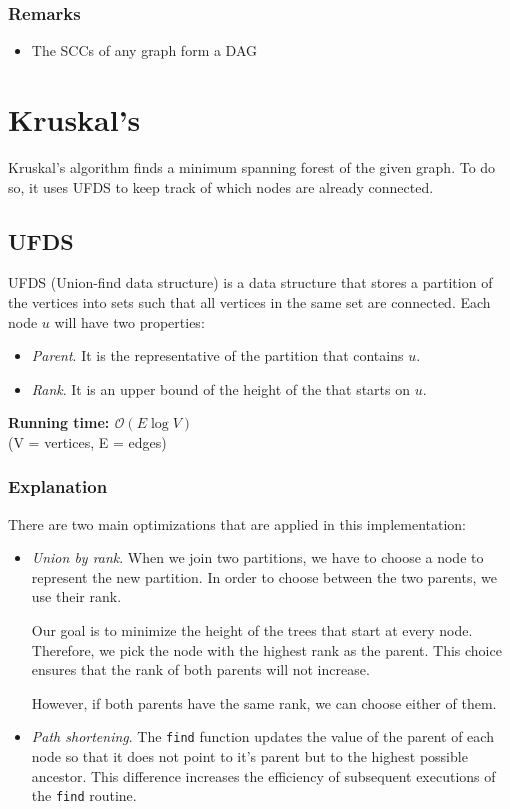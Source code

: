 \subsubsection*{Remarks}
\begin{itemize}
	\item The SCCs of any graph form a DAG
\end{itemize}

\newpage
\section{Kruskal's}
Kruskal's algorithm finds a minimum spanning forest of the given graph. To do so, it
uses UFDS to keep track of which nodes are already connected.
\subsection{UFDS}
UFDS (Union-find data structure) is a data structure that stores a partition of 
the vertices into sets such that all vertices in the same set are connected.
Each node $u$ will have two properties:
\begin{itemize}
	\setlength\itemsep{0pt}
	\item \textit{Parent}. It is the representative of the partition that
		contains $u$.
	\item \textit{Rank}. It is an upper bound of the height of the 
		that starts on $u$. 
\end{itemize}
\noindent \textbf{\boldmath Running time: $\mathcal{O}(E\log V)$}
\\ {\small (V = vertices, E = edges)}
\subsubsection{Explanation}
There are two main optimizations that are applied in this implementation:
\begin{itemize}
	\item \textit{Union by rank}. When we join two partitions, we have to choose
		a node to represent the new partition. In order to choose between the 
		two parents, we use their rank. 

		Our goal is to minimize the height of the trees that start at every node.
		Therefore, we pick the node with the highest rank as the parent. This 
		choice ensures that the rank of both parents will not increase. 

		However, if both parents have the same rank, we can choose either of 
		them.
	\item \textit{Path shortening}. The \texttt{find} function updates the value 
		of the parent of each node so that it does not point to it's 
		 parent but to the highest possible ancestor. This
		difference increases the efficiency of subsequent executions of the 
		\texttt{find} routine. 
\end{itemize}

